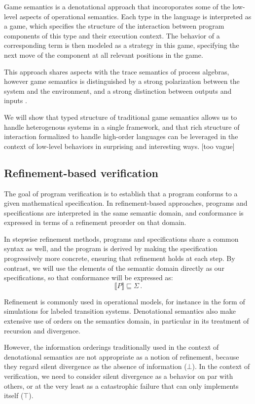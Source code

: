 Game semantics is a denotational approach that
incoroporates some of the low-level aspects of operational semantics.
Each type in the language
is interpreted as a game,
which specifies the structure of the interaction
between program components of this type
and their execution context.
The behavior of a corresponding term
is then modeled as a strategy in this game,
specifying the next move of the component
at all relevant positions in the game.

This approach shares aspects with
the trace semantics of process algebras,
however game semantics is distinguished
by a strong polarization between
the system and the environment,
and a strong distinction between outputs and inputs \cite{cspgs}.

We will show that typed structure of traditional game semantics
allows us to handle heterogenous systems in a single framework,
and that rich structure of interaction
formalized to handle high-order languages
can be leveraged in the context of low-level behaviors
in surprising and interesting ways. [too vague]


\subsection{Refinement-based verification} %

The goal of program verification
is to establish that a program conforms
to a given mathematical specification.
In refinement-based approaches,
programs and specifications are interpreted in the same
semantic domain,
and conformance is expressed in terms of a
refinement preorder on that domain.

In stepwise refinement methods,
programs and specifications share a common syntax as well,
and the program is derived
by making the specification progressively more concrete,
ensuring that refinement holds at each step.
By contrast,
we will use the elements of the semantic domain
directly as our specifications,
so that conformance will be expressed as:
\[ \llbracket P \rrbracket \sqsubseteq \Sigma \,. \]

Refinement is commonly used in operational models,
for instance in the form of simulations
for labeled transition systems.
Denotational semantics also make extensive use of
orders on the semantics domain,
in particular in its treatment of recursion and divergence.

However,
the information orderings traditionally used
in the context of denotational semantics
are not appropriate as a notion of refinement,
because they regard silent divergence
as the absence of information ($\bot$).
In the context of verification,
we need to consider silent divergence
as a behavior on par with others,
or at the very least as a catastrophic failure
that can only implements itself ($\top$).

